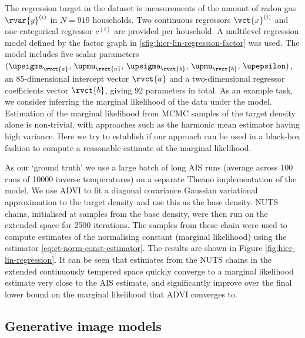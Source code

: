 The regression target in the dataset is measurements of the amount of radon gas $\rvar{y}^{(i)}$ in $N=919$ households. Two continuous regressors $\vct{x}^{(i)}$ and one categorical regressor $c^{(i)}$ are provided per household. A multilevel regression model defined by the factor graph in \ref{sfig:hier-lin-regression-factor} was used. The model includes five scalar parameters $(\upsigma_{\rvct{a}},\,\upmu_{\rvct{a}},\,\upsigma_{\rvct{b}},\,\upmu_{\rvct{b}},\,\upepsilon)$, an 85-dimensional intercept vector $\rvct{a}$ and a two-dimensional regressor coefficients vector $\rvct{b}$, giving 92 parameters in total. As an example task, we consider inferring the marginal likelihood of the data under the model. Estimation of the marginal likelihood from \ac{MCMC} samples of the target density alone is non-trivial, with approaches such as the harmonic mean estimator having high variance. Here we try to establish if our approach can be used in a black-box fashion to compute a reasonable estimate of the marginal likelihood.

As our `ground truth' we use a large batch of long \ac{AIS} runs (average across 100 runs of 10000 inverse temperatures) on a separate Theano implementation of the model. We use \ac{ADVI} to fit a diagonal covariance Gaussian variational approximation to the target density and use this as the base density. \ac{NUTS} chains, initialised at samples from the base density, were then run on the extended space for 2500 iterations. The samples from these chain were used to compute estimates of the normalising constant (marginal likelihood) using the estimator \eqref{eq:ct-norm-const-estimator}. The results are shown in Figure \ref{fig:hier-lin-regression}. It can be seen that estimates from the \ac{NUTS} chains in the extended continuously tempered space quickly converge to a marginal likelihood estimate very close to the \ac{AIS} estimate, and significantly improve over the final lower bound on the marginal likelihood that \ac{ADVI} converges to.

\subsection{Generative image models}\label{subsec:exp-iwae}

